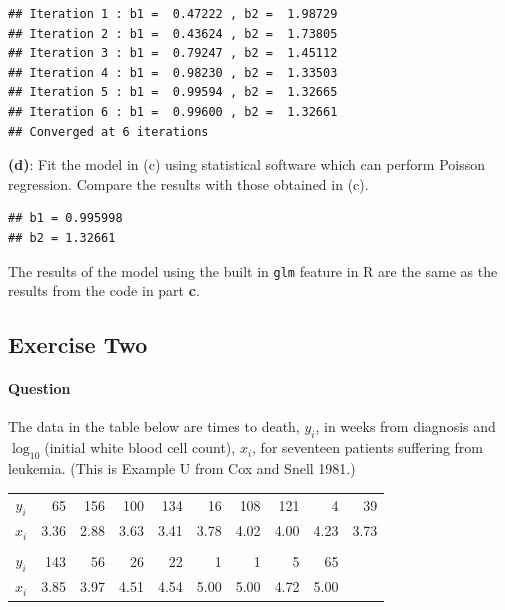 \documentclass[]{article}
\newenvironment{Shaded}{\begin{snugshade}}{\end{snugshade}}
\newcommand{\KeywordTok}[1]{\textcolor[rgb]{0.13,0.29,0.53}{\textbf{{#1}}}}
\newcommand{\DataTypeTok}[1]{\textcolor[rgb]{0.13,0.29,0.53}{{#1}}}
\newcommand{\DecValTok}[1]{\textcolor[rgb]{0.00,0.00,0.81}{{#1}}}
\newcommand{\CharTok}[1]{\textcolor[rgb]{0.31,0.60,0.02}{{#1}}}
\newcommand{\StringTok}[1]{\textcolor[rgb]{0.31,0.60,0.02}{{#1}}}
\newcommand{\NormalTok}[1]{{#1}}
\let\oldparagraph\paragraph
\renewcommand{\paragraph}[1]{\oldparagraph{#1}\mbox{}}
\begin{document}
\begin{verbatim}
## Iteration 1 : b1 =  0.47222 , b2 =  1.98729 
## Iteration 2 : b1 =  0.43624 , b2 =  1.73805 
## Iteration 3 : b1 =  0.79247 , b2 =  1.45112 
## Iteration 4 : b1 =  0.98230 , b2 =  1.33503 
## Iteration 5 : b1 =  0.99594 , b2 =  1.32665 
## Iteration 6 : b1 =  0.99600 , b2 =  1.32661 
## Converged at 6 iterations
\end{verbatim}

\textbf{(d)}: Fit the model in (c) using statistical software which can
perform Poisson regression. Compare the results with those obtained in
(c).

\begin{Shaded}
\end{Shaded}

\begin{verbatim}
## b1 = 0.995998 
## b2 = 1.32661
\end{verbatim}

The results of the model using the built in \texttt{glm} feature in R
are the same as the results from the code in part \textbf{c}.

\pagebreak

\subsection{Exercise Two}\label{exercise-two}

\paragraph{Question}\label{question-1}

The data in the table below are times to death, \(y_i\), in weeks from
diagnosis and \(\log_{10}\)(initial white blood cell count), \(x_i\),
for seventeen patients suffering from leukemia. (This is Example U from
Cox and Snell 1981.)

\begin{center}
\begin{tabular}{@{}crrrrrrrrr@{}}
\toprule
$y_i$ & 65   & 156  & 100  & 134  & 16   & 108  & 121  & 4    & 39   \\
$x_i$ & 3.36 & 2.88 & 3.63 & 3.41 & 3.78 & 4.02 & 4.00 & 4.23 & 3.73 \\
      &      &      &      &      &      &      &      &      &      \\
$y_i$ & 143  & 56   & 26   & 22   & 1    & 1    & 5    & 65   &      \\
$x_i$ & 3.85 & 3.97 & 4.51 & 4.54 & 5.00 & 5.00 & 4.72 & 5.00 &      \\ \bottomrule
\end{tabular}
\end{center}
\end{document}
